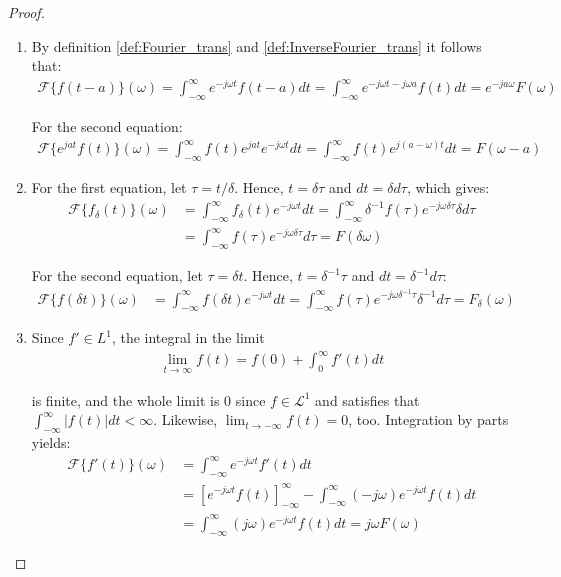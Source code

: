 \begin{proof}
\begin{enumerate}[label=(\alph*)]
\item
By definition \ref{def:Fourier_trans} and \ref{def:InverseFourier_trans} it follows that:
\begin{align*}
\mathcal{F}\{f(t-a)\}(\omega) = \int_{-\infty}^\infty e^{-j\omega t} f(t - a) dt = \int_{-\infty}^\infty e^{-j\omega t - j\omega a} f(t) dt = e^{-ja \omega} F(\omega)
\end{align*}

For the second equation:
\begin{align*}
\mathcal{F}\{e^{jat} f(t)\}(\omega) = \int_{-\infty}^\infty f(t) e^{jat} e^{-j \omega t} dt = \int_{-\infty}^\infty f(t) e^{j(a- \omega)t} dt = F(\omega - a)
\end{align*}

\item For the first equation, let $\tau = t/\delta$. Hence, $t = \delta \tau$ and $dt = \delta d\tau$, which gives:
\begin{align*}
\mathcal{F}\{f_\delta(t)\}(\omega) &= \int_{-\infty}^\infty f_\delta(t) e^{-j \omega t} dt = \int_{-\infty}^\infty \delta^{-1}f(\tau) e^{-j \omega \delta\tau} \delta d\tau \\
&= \int_{-\infty}^\infty f(\tau) e^{-j \omega \delta\tau} d\tau = F(\delta\omega)
\end{align*}

For the second equation, let $\tau = \delta t$. Hence, $t = \delta^{-1}\tau$ and $dt = \delta^{-1} d\tau$:
\begin{align*}
\mathcal{F}\{f(\delta t)\}(\omega) &= \int_{-\infty}^\infty f(\delta t) e^{-j \omega t} dt = \int_{-\infty}^\infty f(\tau) e^{-j \omega \delta^{-1}\tau} \delta^{-1} d\tau = F_\delta(\omega)
\end{align*}

\item Since $f' \in L^1$, the integral in the limit
\begin{align*}
\lim_{t \to \infty} f(t) = f(0) + \int_0^\infty f'(t) dt
\end{align*}

is finite, and the whole limit is 0 since $f\in \mathcal{L}^1$ and satisfies that $\int_{-\infty}^\infty |f(t)| dt < \infty$. Likewise, $\displaystyle{\lim_{t \to -\infty} f(t) = 0}$, too. Integration by parts yields:
\begin{align*}
\mathcal{F}\{f'(t)\}(\omega) &= \int_{-\infty}^\infty e^{-j \omega t} f'(t) dt \\
&= \left[ e^{-j\omega t} f(t) \right]_{-\infty}^\infty - \int_{-\infty}^\infty (-j \omega) e^{-j \omega t} f(t) dt \\
&= \int_{-\infty}^\infty (j \omega) e^{-j \omega t} f(t) dt = j\omega F(\omega)
\end{align*}


\end{enumerate}
\end{proof}
